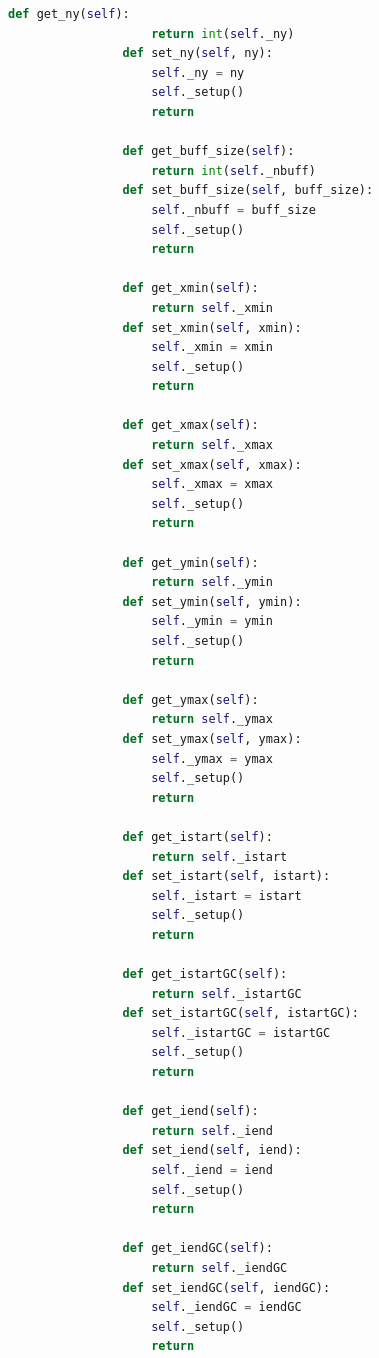\documentclass[12pt]{article}
\begin{document}
\begin{lstlisting}[language={Python}]
                def get_ny(self):
                    return int(self._ny)
                def set_ny(self, ny):
                    self._ny = ny
                    self._setup()
                    return
            
                def get_buff_size(self):
                    return int(self._nbuff)
                def set_buff_size(self, buff_size):
                    self._nbuff = buff_size
                    self._setup()
                    return
            
                def get_xmin(self):
                    return self._xmin
                def set_xmin(self, xmin):
                    self._xmin = xmin
                    self._setup()
                    return 
            
                def get_xmax(self):
                    return self._xmax
                def set_xmax(self, xmax):
                    self._xmax = xmax
                    self._setup()
                    return 
            
                def get_ymin(self):
                    return self._ymin
                def set_ymin(self, ymin):
                    self._ymin = ymin
                    self._setup()
                    return
            
                def get_ymax(self):
                    return self._ymax
                def set_ymax(self, ymax):
                    self._ymax = ymax
                    self._setup()
                    return
            
                def get_istart(self):
                    return self._istart
                def set_istart(self, istart):
                    self._istart = istart
                    self._setup()
                    return
            
                def get_istartGC(self):
                    return self._istartGC
                def set_istartGC(self, istartGC):
                    self._istartGC = istartGC
                    self._setup()
                    return
            
                def get_iend(self):
                    return self._iend
                def set_iend(self, iend):
                    self._iend = iend
                    self._setup()
                    return
                
                def get_iendGC(self):
                    return self._iendGC
                def set_iendGC(self, iendGC):
                    self._iendGC = iendGC
                    self._setup()
                    return
            

\end{lstlisting}
\end{document}
